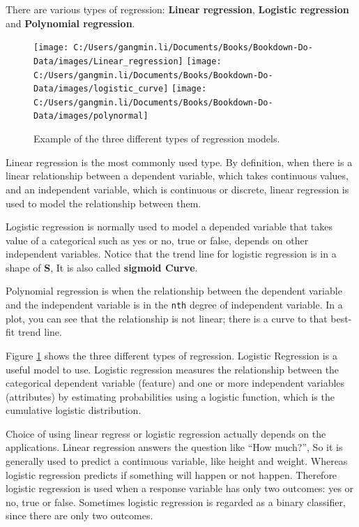 \documentclass[
]{book}
\begin{document}
There are various types of regression: \textbf{Linear regression}, \textbf{Logistic regression} and \textbf{Polynomial regression}.

\begin{figure}

{\centering \texttt{[image: C:/Users/gangmin.li/Documents/Books/Bookdown-Do-Data/images/Linear\_regression]} \texttt{[image: C:/Users/gangmin.li/Documents/Books/Bookdown-Do-Data/images/logistic\_curve]} \texttt{[image: C:/Users/gangmin.li/Documents/Books/Bookdown-Do-Data/images/polynormal]} 

}

\caption{Example of the three different types of regression models.}\label{fig:typeofregression}
\end{figure}

Linear regression is the most commonly used type. By definition, when there is a linear relationship between a dependent variable, which takes continuous values, and an independent variable, which is continuous or discrete, linear regression is used to model the relationship between them.

Logistic regression is normally used to model a depended variable that takes value of a categorical such as yes or no, true or false, depends on other independent variables. Notice that the trend line for logistic regression is in a shape of \textbf{S}, It is also called \textbf{sigmoid Curve}.

Polynomial regression is when the relationship between the dependent variable and the independent variable is in the \texttt{nth} degree of independent variable. In a plot, you can see that the relationship is not linear; there is a curve to that best-fit trend line.

Figure \ref{fig:typeofregression} shows the three different types of regression.
Logistic Regression is a useful model to use. Logistic regression measures the relationship between the categorical dependent variable (feature) and one or more independent variables (attributes) by estimating probabilities using a logistic function, which is the cumulative logistic distribution.

Choice of using linear regress or logistic regression actually depends on the applications. Linear regression answers the question like ``How much?'', So it is generally used to predict a continuous variable, like height and weight. Whereas logistic regression predicts if something will happen or not happen. Therefore logistic regression is used when a response variable has only two outcomes: yes or no, true or false. Sometimes logistic regression is regarded as a binary classifier, since there are only two outcomes.
\end{document}
